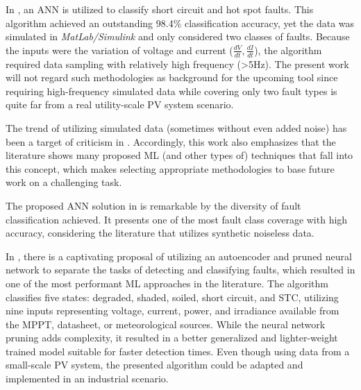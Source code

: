 In \cite{Kumari2022}, an ANN is utilized to classify short circuit and hot spot faults. This algorithm achieved an outstanding 98.4\% classification accuracy, yet the data was simulated in \textit{MatLab/Simulink} and only considered two classes of faults. Because the inputs were the variation of voltage and current ($\frac{dV}{dt},\frac{dI}{dt}$), the algorithm required data sampling with relatively high frequency (>5Hz). The present work will not regard such methodologies as background for the upcoming tool since requiring high-frequency simulated data while covering only two fault types is quite far from a real utility-scale PV system scenario.

The trend of utilizing simulated data (sometimes without even added noise) has been a target of criticism in \cite{Aziz2020}. Accordingly, this work also emphasizes that the literature shows many proposed ML (and other types of) techniques that fall into this concept, which makes selecting appropriate methodologies to base future work on a challenging task.

The proposed ANN solution in \cite{Rao2019} is remarkable by the diversity of fault classification achieved. It presents one of the most fault class coverage with high accuracy, considering the literature that utilizes synthetic noiseless data.

In \cite{Rao2021}, there is a captivating proposal of utilizing an autoencoder and pruned neural network to separate the tasks of detecting and classifying faults, which resulted in one of the most performant ML approaches in the literature. The algorithm classifies five states: degraded, shaded, soiled, short circuit, and STC, utilizing nine inputs representing voltage, current, power, and irradiance available from the MPPT, datasheet, or meteorological sources. While the neural network pruning adds complexity, it resulted in a better generalized and lighter-weight trained model suitable for faster detection times. Even though using data from a small-scale PV system, the presented algorithm could be adapted and implemented in an industrial scenario.


